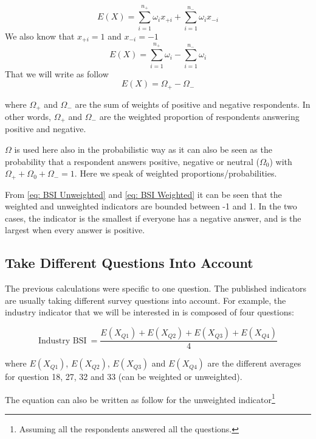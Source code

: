 \documentclass[12pt,a4paper,oneside]{book}
\begin{document}
\begin{equation}
    E(X) = \sum_{i=1}^{n_+} \omega_{i} x_{+i} + \sum_{i=1}^{n_-} \omega_{i} x_{-i}
\end{equation} 
We also know that $x_{+i} = 1$  and $x_{-i}=-1$  
\begin{equation}
    E(X) = \sum_{i=1}^{n_+} \omega_{i}  - \sum_{i=1}^{n_-} \omega_{i}
\end{equation}
That we will write as follow
\begin{equation}
    E(X) = \Omega_+ - \Omega_- \label{eq: BSI Weighted}
\end{equation}

where $\Omega_+$ and $\Omega_-$ are the sum of weights of positive and negative respondents. 
In other words, $\Omega_+$ and $\Omega_-$ are the weighted proportion of respondents answering positive and negative. 

$\Omega$ is used here also in the probabilistic way as it can also be seen as the probability that a respondent answers positive, negative or neutral ($\Omega_0$) with $\Omega_+ + \Omega_0 + \Omega_- =1$. Here we speak of weighted proportions/probabilities.

From \autoref{eq: BSI Unweighted} and \autoref{eq: BSI Weighted} it can be seen that the weighted and unweighted indicators are bounded between -1 and 1. In the two cases, the indicator is the smallest if everyone has a negative answer, and is the largest when every answer is positive.

\subsection{Take Different Questions Into Account}

The previous calculations were specific to one question. The published indicators are usually taking different survey questions into account. For example, the industry indicator that we will be interested in is composed of four questions:

\begin{equation}
    \mbox{Industry BSI}\ = \frac{E(X_{Q1}) + E(X_{Q2}) + E(X_{Q3}) + E(X_{Q4})}{4}
\end{equation}

where 
$E(X_{Q1})$, $E(X_{Q2})$, $E(X_{Q3})$ and $E(X_{Q4})$ are the different averages for question 18, 27, 32 and 33 (can be weighted or unweighted).

The equation can also be written as follow for the unweighted indicator\footnote{Assuming all the respondents answered all the questions.}
\end{document}
